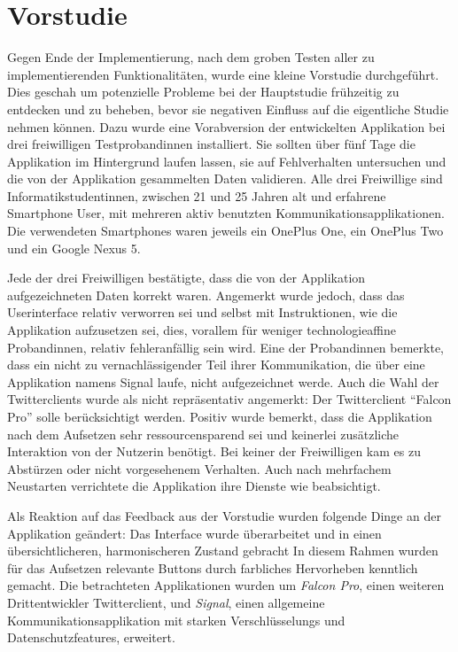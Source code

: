 \section{Vorstudie}

Gegen Ende der Implementierung, nach dem groben Testen aller zu implementierenden Funktionalitäten, wurde eine kleine Vorstudie durchgeführt.
Dies geschah um potenzielle Probleme bei der Hauptstudie frühzeitig zu entdecken und zu beheben, bevor sie negativen Einfluss auf die eigentliche Studie nehmen können.
Dazu wurde eine Vorabversion der entwickelten Applikation bei drei freiwilligen Testprobandinnen installiert.
Sie sollten über fünf Tage die Applikation im Hintergrund laufen lassen, sie auf Fehlverhalten untersuchen und die von der Applikation gesammelten Daten validieren.
Alle drei Freiwillige sind Informatikstudentinnen, zwischen 21 und 25 Jahren alt und erfahrene Smartphone User, mit mehreren aktiv benutzten Kommunikationsapplikationen.
Die verwendeten Smartphones waren jeweils ein OnePlus One, ein OnePlus Two und ein Google Nexus 5.
\par
Jede der drei Freiwilligen bestätigte, dass die von der Applikation aufgezeichneten Daten korrekt waren.
Angemerkt wurde jedoch, dass das Userinterface relativ verworren sei und selbst mit Instruktionen, wie die Applikation aufzusetzen sei, dies, vorallem für weniger technologieaffine Probandinnen, relativ fehleranfällig sein wird.
Eine der Probandinnen bemerkte, dass ein nicht zu vernachlässigender Teil ihrer Kommunikation, die über eine Applikation namens Signal laufe, nicht aufgezeichnet werde.
Auch die Wahl der Twitterclients wurde als nicht repräsentativ angemerkt:
Der Twitterclient "`Falcon Pro"' solle berücksichtigt werden.
Positiv wurde bemerkt, dass die Applikation nach dem Aufsetzen sehr ressourcensparend sei und keinerlei zusätzliche Interaktion von der Nutzerin benötigt.
Bei keiner der Freiwilligen kam es zu Abstürzen oder nicht vorgesehenem Verhalten. Auch nach mehrfachem Neustarten verrichtete die Applikation ihre Dienste wie beabsichtigt.
\par
Als Reaktion auf das Feedback aus der Vorstudie wurden folgende Dinge an der Applikation geändert:
Das Interface wurde überarbeitet und in einen übersichtlicheren, harmonischeren Zustand gebracht
In diesem Rahmen wurden für das Aufsetzen relevante Buttons durch farbliches Hervorheben kenntlich gemacht.
Die betrachteten Applikationen wurden um \emph{Falcon Pro}, einen weiteren Drittentwickler Twitterclient, und \emph{Signal}, einen allgemeine Kommunikationsapplikation mit starken Verschlüsselungs und Datenschutzfeatures, erweitert.
